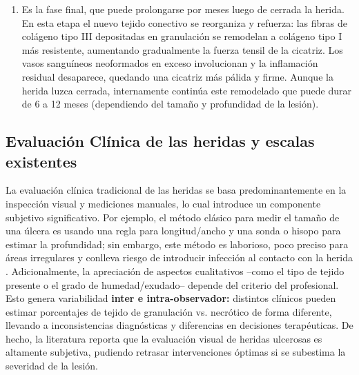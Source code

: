 \begin{enumerate}
\begin{enumerate}
        \item Es la fase final, que puede prolongarse por meses luego de cerrada la herida. En esta etapa el nuevo tejido conectivo se reorganiza y refuerza: las fibras de colágeno tipo III depositadas en granulación se remodelan a colágeno tipo I más resistente, aumentando gradualmente la fuerza tensil de la cicatriz. Los vasos sanguíneos neoformados en exceso involucionan y la inflamación residual desaparece, quedando una cicatriz más pálida y firme. Aunque la herida luzca cerrada, internamente continúa este remodelado que puede durar de 6 a 12 meses (dependiendo del tamaño y profundidad de la lesión).
    \end{enumerate}
\end{enumerate}


\subsection{Evaluación Clínica de las heridas y escalas existentes}

La evaluación clínica tradicional de las heridas se basa predominantemente en la inspección visual y mediciones manuales, lo cual introduce un componente subjetivo significativo. Por ejemplo, el método clásico para medir el tamaño de una úlcera es usando una regla para longitud/ancho y una sonda o hisopo para estimar la profundidad; sin embargo, este método es laborioso, poco preciso para áreas irregulares y conlleva riesgo de introducir infección al contacto con la herida \cite{healthcare11020273}. Adicionalmente, la apreciación de aspectos cualitativos –como el tipo de tejido presente o el grado de humedad/exudado– depende del criterio del profesional. Esto genera variabilidad \textbf{inter e intra-observador:} distintos clínicos pueden estimar porcentajes de tejido de granulación vs. necrótico de forma diferente, llevando a inconsistencias diagnósticas y diferencias en decisiones terapéuticas. De hecho, la literatura reporta que la evaluación visual de heridas ulcerosas es altamente subjetiva, pudiendo retrasar intervenciones óptimas si se subestima la severidad de la lesión.

